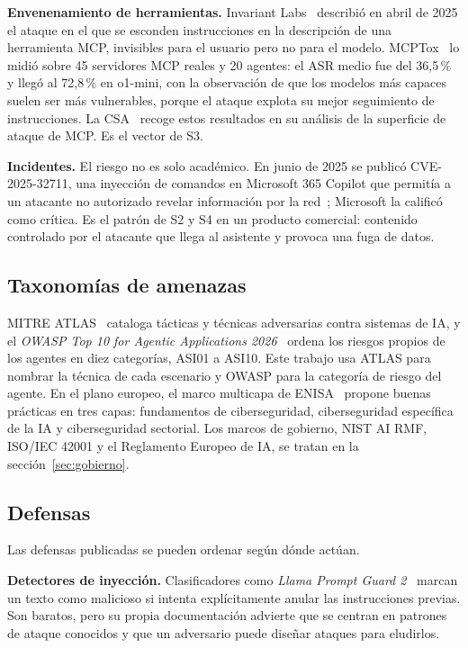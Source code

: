 \documentclass[11pt,a4paper]{article}
\newcommand{\atlas}[1]{\textsc{#1}}
\begin{document}
\textbf{Envenenamiento de herramientas.} Invariant Labs~\cite{invariant2025} describió en abril de 2025 el
ataque en el que se esconden instrucciones en la descripción de una herramienta MCP, invisibles para el usuario
pero no para el modelo. MCPTox~\cite{wang2025mcptox} lo midió sobre 45 servidores MCP reales y 20 agentes: el
ASR medio fue del 36,5\,\% y llegó al 72,8\,\% en o1-mini, con la observación de que los modelos más capaces
suelen ser más vulnerables, porque el ataque explota su mejor seguimiento de instrucciones. La
\atlas{CSA}~\cite{csa_tool_poisoning_2026} recoge estos resultados en su análisis de la superficie de ataque de
MCP. Es el vector de S3.

\textbf{Incidentes.} El riesgo no es solo académico. En junio de 2025 se publicó CVE-2025-32711, una inyección
de comandos en Microsoft 365 Copilot que permitía a un atacante no autorizado revelar información por la
red~\cite{nvd_cve_2025_32711}; Microsoft la calificó como crítica. Es el patrón de S2 y S4 en un producto
comercial: contenido controlado por el atacante que llega al asistente y provoca una fuga de datos.

\subsection{Taxonomías de amenazas}
\atlas{MITRE ATLAS}~\cite{mitre_atlas} cataloga tácticas y técnicas adversarias contra sistemas de IA, y el \emph{OWASP Top 10 for Agentic Applications 2026}~\cite{owasp_asi_2026} ordena los
riesgos propios de los agentes en diez categorías, ASI01 a ASI10. Este trabajo usa ATLAS para nombrar la técnica
de cada escenario y OWASP para la categoría de riesgo del agente. En el plano europeo, el marco multicapa de
\atlas{ENISA}~\cite{enisa_ai} propone buenas prácticas en tres capas: fundamentos de ciberseguridad,
ciberseguridad específica de la IA y ciberseguridad sectorial. Los marcos de gobierno, NIST AI RMF, ISO/IEC
42001 y el Reglamento Europeo de IA, se tratan en la sección~\ref{sec:gobierno}.

\subsection{Defensas}
Las defensas publicadas se pueden ordenar según dónde actúan.

\textbf{Detectores de inyección.} Clasificadores como \emph{Llama Prompt Guard 2}~\cite{prompt_guard2} marcan un
texto como malicioso si intenta explícitamente anular las instrucciones previas. Son baratos, pero su propia
documentación advierte que se centran en patrones de ataque conocidos y que un adversario puede diseñar ataques
para eludirlos.
\end{document}
